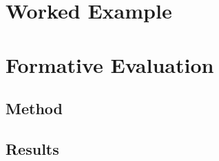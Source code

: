 \documentclass[sigconf,review]{acmart}
\begin{document}

\section{Worked Example}
\label{sec:example}


\section{Formative Evaluation}
\label{sec:eval}


\subsection{Method}

\subsection{Results}
\end{document}
